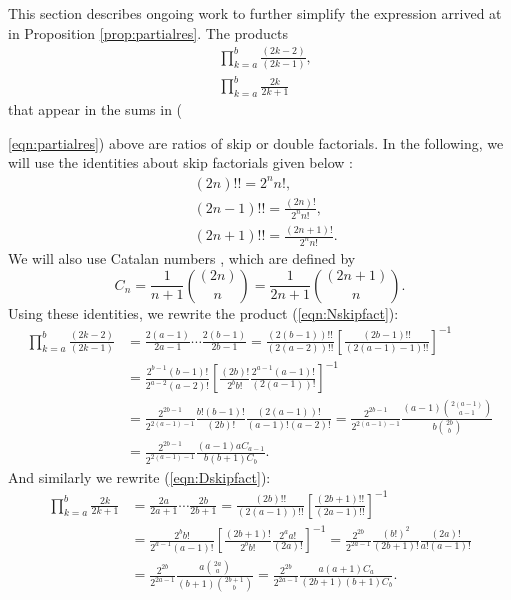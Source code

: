 \documentclass[11pt]{article}
\theoremstyle{definition}
\theoremstyle{definition}
\theoremstyle{plain}
\theoremstyle{plain}
\theoremstyle{plain}
\theoremstyle{definition}
\theoremstyle{definition}
\begin{document}
This section describes ongoing work to further simplify the expression arrived at in Proposition \ref{prop:partialres}. The products
\begin{align}
&\prod\limits_{k=a}^{b}\frac{(2k-2)}{(2k-1)}, \label{eqn:Nskipfact}\\
&\prod\limits_{k=a}^b\frac{2k}{2k+1} \label{eqn:Dskipfact}
\end{align}
that appear in the sums in ({\ref{eqn:partialres}) above are ratios of skip or double factorials. In the following, we will use the identities about skip factorials given below \cite{weisstein_double_nodate}:
\begin{align*}
&(2n)!! = 2^nn!, \\
&(2n-1)!! = \frac{(2n)!}{2^nn!}, \\
&(2n+1)!! = \frac{(2n+1)!}{2^nn!}.
\end{align*}
We will also use Catalan numbers \cite{weisstein_catalan_nodate}, which are defined by
\begin{equation*}
C_n = \frac{1}{n+1}\binom{(2n)}{n} = \frac{1}{2n+1}\binom{(2n+1)}{n}.
\end{equation*}
Using these identities, we rewrite the product (\ref{eqn:Nskipfact}):
\begin{equation}\label{eqn:Nskipfactsimp}
\begin{aligned}
\prod\limits_{k=a}^{b}\frac{(2k-2)}{(2k-1)} &= \frac{2(a-1)}{2a-1}\cdots\frac{2(b-1)}{2b-1} = \frac{(2(b-1))!!}{(2(a-2))!!}\left[\frac{(2b-1)!!}{(2(a-1)-1)!!}\right]^{-1} \\
&= \frac{2^{b-1}(b-1)!}{2^{a-2}(a-2)!}\left[\frac{(2b)!}{2^bb!}\frac{2^{a-1}(a-1)!}{(2(a-1))!}\right]^{-1} \\
&= \frac{2^{2b-1}}{2^{2(a-1)-1}}\frac{b!(b-1)!}{(2b)!}\frac{(2(a-1))!}{(a-1)!(a-2)!} = \frac{2^{2b-1}}{2^{2(a-1)-1}}\frac{(a-1)\binom{2(a-1)}{a-1}}{b\binom{2b}{b}} \\
&= \frac{2^{2b-1}}{2^{2(a-1)-1}}\frac{(a-1)aC_{a-1}}{b(b+1)C_b}.
\end{aligned}
\end{equation}
And similarly we rewrite (\ref{eqn:Dskipfact}):
\begin{equation}\label{eqn:Dskipfactsimp}
\begin{aligned}
\prod\limits_{k=a}^b\frac{2k}{2k+1} &= \frac{2a}{2a+1}\cdots\frac{2b}{2b+1} = \frac{(2b)!!}{(2(a-1))!!}\left[\frac{(2b+1)!!}{(2a-1)!!}\right]^{-1} \\
&= \frac{2^bb!}{2^{a-1}(a-1)!}\left[\frac{(2b+1)!}{2^bb!}\frac{2^aa!}{(2a)!}\right]^{-1} = \frac{2^{2b}}{2^{2a-1}}\frac{(b!)^2}{(2b+1)!}\frac{(2a)!}{a!(a-1)!} \\
&= \frac{2^{2b}}{2^{2a-1}}\frac{a\binom{2a}{a}}{(b+1)\binom{2b+1}{b}} = \frac{2^{2b}}{2^{2a-1}}\frac{a(a+1)C_a}{(2b+1)(b+1)C_b}.
\end{aligned}
\end{equation}

}
\end{document}
